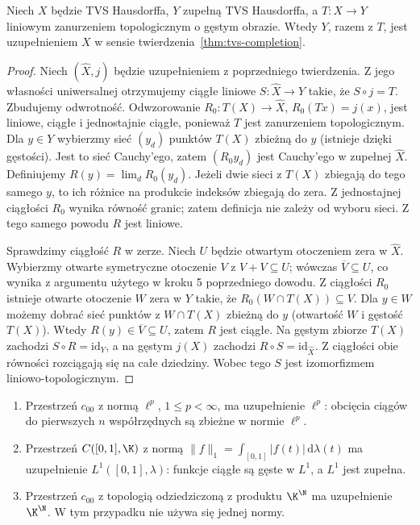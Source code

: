 \begin{stwierdzenie}\label{prop:completion-criterion}
Niech $X$ będzie TVS Hausdorffa, $Y$ zupełną TVS Hausdorffa,
a $T:X\to Y$ liniowym zanurzeniem topologicznym o gęstym obrazie.
Wtedy $Y$, razem z $T$, jest uzupełnieniem $X$ w sensie
twierdzenia~\ref{thm:tvs-completion}.
\end{stwierdzenie}
\begin{proof}
Niech $(\widehat X,j)$ będzie uzupełnieniem z poprzedniego
twierdzenia. Z jego własności uniwersalnej otrzymujemy ciągłe
liniowe $S:\widehat X\to Y$ takie, że $S\circ j=T$.
Zbudujemy odwrotność. Odwzorowanie
$R_0:T(X)\to\widehat X$, $R_0(Tx)=j(x)$, jest liniowe,
ciągłe i jednostajnie ciągłe, ponieważ $T$ jest zanurzeniem
topologicznym. Dla $y\in Y$ wybierzmy sieć
$(y_d)$ punktów $T(X)$ zbieżną do $y$ (istnieje dzięki
gęstości). Jest to sieć Cauchy'ego, zatem $(R_0y_d)$
jest Cauchy'ego w zupełnej $\widehat X$. Definiujemy
$R(y)=\lim_d R_0(y_d)$.
Jeżeli dwie sieci z $T(X)$ zbiegają do tego samego $y$,
to ich różnice na produkcie indeksów zbiegają do zera.
Z jednostajnej ciągłości $R_0$ wynika równość granic;
zatem definicja nie zależy od wyboru sieci. Z tego samego
powodu $R$ jest liniowe.

Sprawdzimy ciągłość $R$ w zerze. Niech $U$ będzie otwartym
otoczeniem zera w $\widehat X$. Wybierzmy otwarte
symetryczne otoczenie $V$ z $V+V\subseteq U$;
wówczas $\overline V\subseteq U$, co wynika z argumentu
użytego w kroku 5 poprzedniego dowodu. Z ciągłości $R_0$
istnieje otwarte otoczenie $W$ zera w $Y$ takie, że
$R_0(W\cap T(X))\subseteq V$.
Dla $y\in W$ możemy dobrać sieć punktów z $W\cap T(X)$
zbieżną do $y$ (otwartość $W$ i gęstość $T(X)$).
Wtedy $R(y)\in\overline V\subseteq U$, zatem $R$
jest ciągłe. Na gęstym zbiorze $T(X)$ zachodzi
$S\circ R=\mathrm{id}_Y$, a na gęstym $j(X)$ zachodzi
$R\circ S=\mathrm{id}_{\widehat X}$. Z ciągłości obie
równości rozciągają się na całe dziedziny. Wobec tego
$S$ jest izomorfizmem liniowo-topologicznym.
\end{proof}

\begin{przyklad}
\begin{enumerate}[label=\textup{(\roman*)}]
\item Przestrzeń $c_{00}$ z normą $\ell^p$, $1\leq p<\infty$,
      ma uzupełnienie $\ell^p$: obcięcia ciągów do pierwszych
      $n$ współrzędnych są zbieżne w normie $\ell^p$.
\item Przestrzeń $C([0,1],\K)$ z normą
      $\|f\|_1=\int_{[0,1]}|f(t)|\,\mathrm d\lambda(t)$
      ma uzupełnienie $L^1([0,1],\lambda)$: funkcje ciągłe
      są gęste w $L^1$, a $L^1$ jest zupełna.
\item Przestrzeń $c_{00}$ z topologią odziedziczoną
      z produktu $\K^{\N}$ ma uzupełnienie $\K^{\N}$.
      W tym przypadku nie używa się jednej normy.
\end{enumerate}
\end{przyklad}

